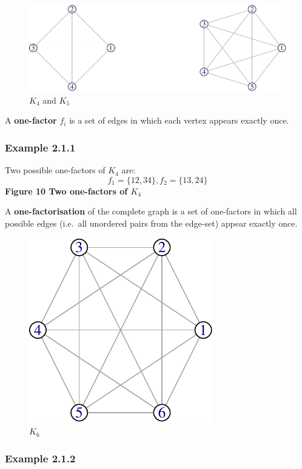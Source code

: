 \documentclass[
  12pt,
  a4paper]{book}
\begin{document}
\begin{figure}
\centering
\includegraphics{figure/complete-graph-1.pdf}
\caption{\(K_4\) and \(K_5\)}
\end{figure}

A \textbf{one-factor} \(f_i\) is a set of edges in which each vertex
appears exactly once.

\hypertarget{example-2.1.1}{%
\subsubsection{Example 2.1.1}\label{example-2.1.1}}

Two possible one-factors of \(K_4\) are:
\[f_1 = \{12,34\}, f_2 = \{13,24\}\] \textbf{Figure 10 Two one-factors
of \(K_4\)}

A \textbf{one-factorisation} of the complete graph is a set of
one-factors in which all possible edges (i.e.~all unordered pairs from
the edge-set) appear exactly once.

\begin{figure}
\centering
\includegraphics{figure/K6-1.pdf}
\caption{\(K_6\)}
\end{figure}

\hypertarget{example-2.1.2}{%
\subsubsection{Example 2.1.2}\label{example-2.1.2}}
\end{document}

